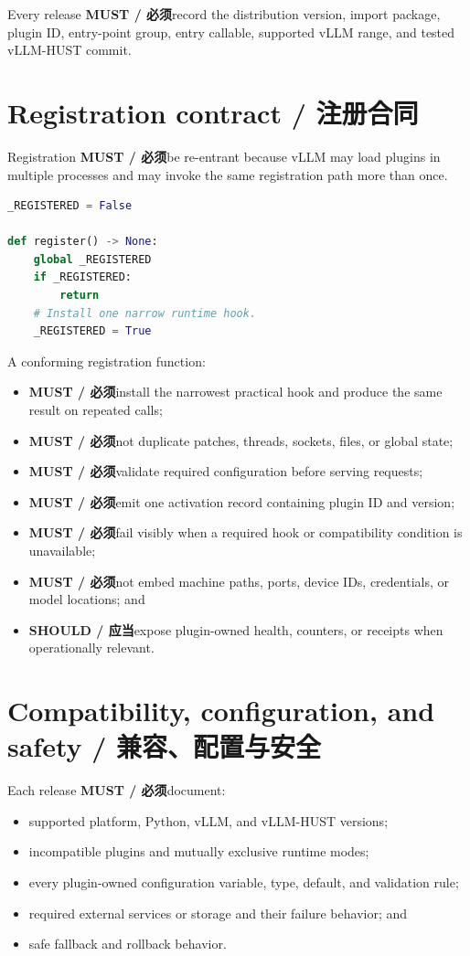 \documentclass[11pt,a4paper,fontset=none]{ctexart}
\newcommand{\must}{\textbf{MUST / 必须}}
\newcommand{\should}{\textbf{SHOULD / 应当}}
\begin{document}
Every release \must record the distribution version, import package, plugin ID, entry-point group,
entry callable, supported vLLM range, and tested vLLM-HUST commit.

\section{Registration contract / 注册合同}

Registration \must be re-entrant because vLLM may load plugins in multiple processes and may invoke
the same registration path more than once.

\begin{lstlisting}[language=Python]
_REGISTERED = False

def register() -> None:
    global _REGISTERED
    if _REGISTERED:
        return
    # Install one narrow runtime hook.
    _REGISTERED = True
\end{lstlisting}

A conforming registration function:

\begin{itemize}
  \item \must install the narrowest practical hook and produce the same result on repeated calls;
  \item \must not duplicate patches, threads, sockets, files, or global state;
  \item \must validate required configuration before serving requests;
  \item \must emit one activation record containing plugin ID and version;
  \item \must fail visibly when a required hook or compatibility condition is unavailable;
  \item \must not embed machine paths, ports, device IDs, credentials, or model locations; and
  \item \should expose plugin-owned health, counters, or receipts when operationally relevant.
\end{itemize}

\section{Compatibility, configuration, and safety / 兼容、配置与安全}

Each release \must document:

\begin{itemize}
  \item supported platform, Python, vLLM, and vLLM-HUST versions;
  \item incompatible plugins and mutually exclusive runtime modes;
  \item every plugin-owned configuration variable, type, default, and validation rule;
  \item required external services or storage and their failure behavior; and
  \item safe fallback and rollback behavior.
\end{itemize}
\end{document}
